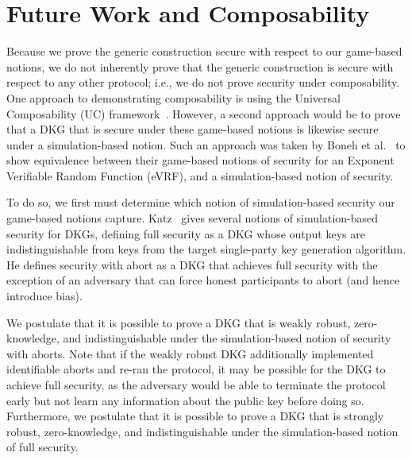 \section{Future Work and Composability}
\label{storm:future-work}

Because we prove the generic construction secure with respect to our game-based
notions,
we do not inherently prove that the generic construction is secure with respect
to any other protocol;
i.e., we do not prove security under composability.
One approach to demonstrating composability is using the Universal Composability (UC) framework~\cite{Canetti01}.
However, a second approach would be to prove that a DKG that is secure under
these game-based notions is likewise secure under a simulation-based notion.
Such an approach was taken by Boneh et al.~\cite{BonehHL24} to show equivalence between
their game-based notions of security for an Exponent Verifiable Random Function (eVRF),
and a simulation-based notion of security.

To do so, we first must determine which notion of simulation-based security our game-based notions capture.
Katz~\cite{Katz24} gives several notions of simulation-based security for DKGs,
defining full security as a DKG whose output keys are indistinguishable from keys
from the target single-party key generation algorithm.
He defines security with abort as a DKG that achieves full security with the
exception of an adversary that can force honest participants to abort (and
hence introduce bias).

We postulate that it is possible to prove a DKG that is weakly robust,
zero-knowledge, and indistinguishable under the simulation-based notion of
security with aborts.
Note that if the weakly robust DKG additionally implemented identifiable aborts and re-ran the protocol,
it may be possible for the DKG to achieve full security,
as the adversary would be able to terminate the protocol early but not learn any information about the public key before doing so.
Furthermore, we postulate that it is possible to prove a DKG that is strongly
robust, zero-knowledge, and indistinguishable under the simulation-based notion
of full security.
